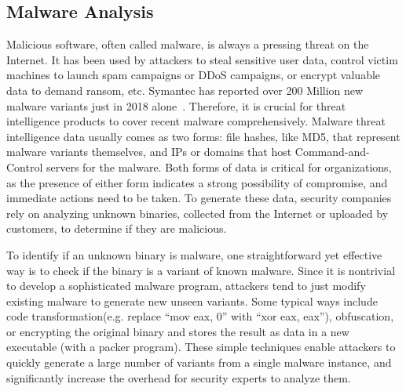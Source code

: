 \subsection{Malware Analysis}
Malicious software, often called malware, is always a pressing threat 
on the Internet. It has been used by attackers to steal sensitive user data, 
control victim machines to launch spam campaigns or DDoS campaigns, or 
encrypt valuable data to demand ransom, etc. Symantec has reported over 200 
Million new malware variants just in 2018 alone~\cite{symantecmalware}. 
Therefore, it is crucial for threat intelligence products to cover recent 
malware comprehensively.
Malware threat intelligence data usually comes as two forms: file hashes,
like MD5, that represent malware variants themselves, and IPs or domains
that host Command-and-Control servers for the malware. Both forms of 
data is critical for organizations, as the presence of either form 
indicates a strong possibility of compromise, and immediate actions need 
to be taken. To generate these data, security companies rely on analyzing 
unknown binaries, collected from the Internet or uploaded by customers,
to determine if they are malicious.

To identify if an unknown binary is malware, one straightforward yet
effective way is to check if the binary is a variant of known malware.
Since it is nontrivial to develop a sophisticated malware program, 
attackers tend to just modify existing malware to generate new unseen
variants. Some typical ways include code transformation(e.g. replace ``mov 
eax, 0'' with ``xor eax, eax''), obfuscation, or encrypting the original 
binary and stores the result as data in a new executable (with a packer 
program). These simple techniques enable attackers to quickly generate a 
large number of variants from a single malware instance, and significantly 
increase the overhead for security experts to analyze them.

